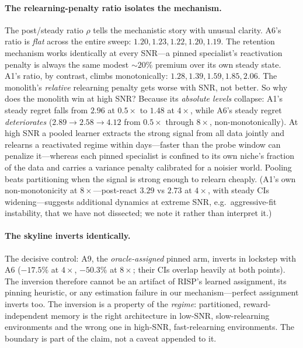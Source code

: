 \paragraph{The relearning-penalty ratio isolates the mechanism.} The
post/steady ratio $\rho$ tells the mechanistic story with unusual clarity.
A6's ratio is \emph{flat} across the entire sweep:
$1.20, 1.23, 1.22, 1.20, 1.19$. The retention mechanism works identically
at every SNR---a pinned specialist's reactivation penalty is always the
same modest $\sim\!20\%$ premium over its own steady state. A1's ratio, by
contrast, climbs monotonically: $1.28, 1.39, 1.59, 1.85, 2.06$. The
monolith's \emph{relative} relearning penalty gets worse with SNR, not
better. So why does the monolith win at high SNR? Because its
\emph{absolute levels} collapse: A1's steady regret falls from $2.96$ at
$0.5\times$ to $1.48$ at $4\times$, while A6's steady regret
\emph{deteriorates} ($2.89 \to 2.58 \to 4.12$ from $0.5\times$ through
$8\times$, non-monotonically). At high SNR a pooled learner extracts the
strong signal from all data jointly and relearns a reactivated regime
within days---faster than the probe window can penalize it---whereas each
pinned specialist is confined to its own niche's fraction of the data and
carries a variance penalty calibrated for a noisier world. Pooling beats
partitioning when the signal is strong enough to relearn cheaply. (A1's
own non-monotonicity at $8\times$---post-react $3.29$ vs $2.73$ at
$4\times$, with steady CIs widening---suggests additional dynamics at
extreme SNR, e.g.\ aggressive-fit instability, that we have not dissected;
we note it rather than interpret it.)

\paragraph{The skyline inverts identically.} The decisive control: A9, the
\emph{oracle-assigned} pinned arm, inverts in lockstep with A6 ($-17.5\%$
at $4\times$, $-50.3\%$ at $8\times$; their CIs overlap heavily at both
points). The inversion therefore cannot be an artifact of RISP's
learned assignment, its pinning heuristic, or any estimation failure in
our mechanism---perfect assignment inverts too. The inversion is a property
of the \emph{regime}: partitioned, reward-independent memory is the right
architecture in low-SNR, slow-relearning environments and the wrong one in
high-SNR, fast-relearning environments. The boundary is part of the claim,
not a caveat appended to it.

